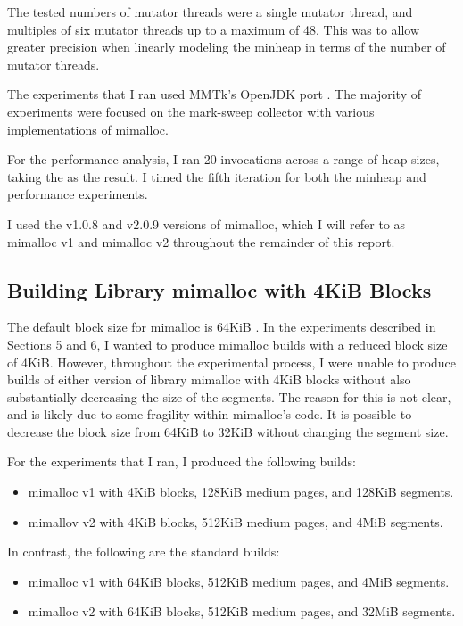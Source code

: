 \documentclass{article}
\begin{document}
The tested numbers of mutator threads were a single mutator thread, and multiples of six mutator threads up to a maximum of 48. This was to allow greater precision when linearly modeling the minheap in terms of the number of mutator threads.

The experiments that I ran used MMTk's OpenJDK port \cite{mmtk-openjdk}. The majority of experiments were focused on the mark-sweep collector with various implementations of mimalloc.

For the performance analysis, I ran 20 invocations across a range of heap sizes, taking the as the result. I timed the fifth iteration for both the minheap and performance experiments.

I used the v1.0.8 and v2.0.9 versions of mimalloc, which I will refer to as mimalloc v1 and mimalloc v2 throughout the remainder of this report.

\subsection{Building Library mimalloc with 4KiB Blocks}
The default block size for mimalloc is 64KiB \cite{leijen2019mimalloc}. In the experiments described in Sections 5 and 6, I wanted to produce mimalloc builds with a reduced block size of 4KiB. However, throughout the experimental process, I were unable to produce builds of either version of library mimalloc with 4KiB blocks without also substantially decreasing the size of the segments. The reason for this is not clear, and is likely due to some fragility within mimalloc's code. It is possible to decrease the block size from 64KiB to 32KiB without changing the segment size.

For the experiments that I ran, I produced the following builds:
\begin{itemize}
    \item mimalloc v1 with 4KiB blocks, 128KiB medium pages, and 128KiB segments.
    \item mimallov v2 with 4KiB blocks, 512KiB medium pages, and 4MiB segments.
\end{itemize}

In contrast, the following are the standard builds:
\begin{itemize}
    \item mimalloc v1 with 64KiB blocks, 512KiB medium pages, and 4MiB segments.
    \item mimalloc v2 with 64KiB blocks, 512KiB medium pages, and 32MiB segments.
\end{itemize}
\end{document}
